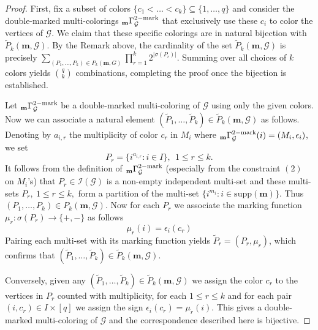 \documentclass[11pt,reqno]{amsart}
\numberwithin{equation}{section} %
\theoremstyle{definition}
\theoremstyle{remark}
\numberwithin{equation}{section}
\begin{document}
\begin{proof}

First, fix a subset of colors $\{c_1 < \dots < c_k\} \subseteq \{1, \dots, q\}$ and consider the double-marked multi-colorings $_{\bold m}\Gamma^{2-\mathrm{mark}}_\mathcal{G}$ that exclusively use these $c_i$ to color the vertices of $\mathcal{G}$. We claim that these specific colorings are in natural bijection with $\widetilde{P}_k(\mathbf{m}, \mathcal{G})$. By the Remark above, the cardinality of the set $\widetilde{P}_k(\mathbf{m}, \mathcal{G})$ is precisely $\sum_{(P_1,\ldots,P_k)\in P_k(\mathbf m,G)}\prod_{r=1}^k 2^{|\sigma(P_r)|}$. Summing over all choices of $k$ colors yields $\binom{q}{k}$ combinations, completing the proof once the bijection is established.


\medskip
Let $_{\bold{m}}\Gamma^{2-\mathrm{mark}}_\mathcal{G}$ be a double-marked multi-coloring of $\mathcal{G}$ using only the given colors. Now we can associate a natural element $(\widetilde{P}_1, \dots, \widetilde{P}_k)\in \widetilde{P}_k(\mathbf{m},\mathcal{G})$ as follows. Denoting by $a_{i,r}$ the multiplicity of color $c_r$ in $M_i$ where $_{\bold{m}}\Gamma^{2-\mathrm{mark}}_\mathcal{G}(i) = (M_i, \epsilon_i)$, we set 
$$P_r=\{i^{a_{i,r}}: i\in I\},\ \ 1\le r\le k.$$
It follows from the definition of $_{\bold{m}}\Gamma^{2-\mathrm{mark}}_\mathcal{G}$ (especially from the constraint $(2)$ on $M_i$'s) that $P_r\in \mathcal{I}({\mathcal{G}})$ is a non-empty independent multi-set and these multi-sets $P_r,\ 1\le r\le k,$ form a partition of the multi-set $\{i^{m_i}: i\in \mathrm{supp}(\mathbf{m})\}$. Thus $(P_1,\dots,P_k)\in {P}_k(\mathbf{m},\mathcal{G})$. Now for each $P_r$ we associate the marking function $\mu_r:\sigma (P_r)\rightarrow \{+,-\}$ as follows 
$$\mu_r(i)=\epsilon_i(c_r)$$
Pairing each multi-set with its marking function yields $\widetilde{P}_r = (P_r, \mu_r)$, which confirms that $(\widetilde{P}_1, \dots, \widetilde{P}_k) \in \widetilde{P}_k(\mathbf{m}, \mathcal{G})$.



Conversely, given any $(\widetilde{P}_1, \dots, \widetilde{P}_k)\in \widetilde{P}_k(\mathbf{m},\mathcal{G})$ we
assign the color $c_r$ to the vertices in $P_r$ counted with multiplicity, for each $1\le r\le k$ and for each pair $(i,c_r)\in I\times [q]$   we assign the sign $\epsilon_i(c_r)=\mu_r(i)$. This gives a double-marked multi-coloring of $\mathcal{G}$ and the  correspondence described  here is bijective. 





\end{proof}
\end{document}
